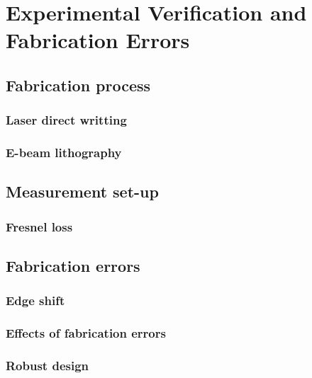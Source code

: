 \cleardoublepage
\chapter{Experimental Verification and Fabrication Errors}

\section{Fabrication process}
\subsection{Laser direct writting}
\subsection{E-beam lithography}

\section{Measurement set-up}
\subsection{Fresnel loss}
\section{Fabrication errors}
\subsection{Edge shift}
\subsection{Effects of fabrication errors}
\subsection{Robust design}

